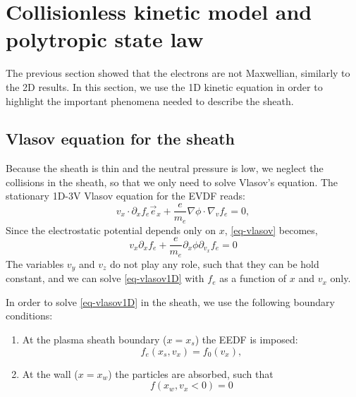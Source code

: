 
\section{Collisionless kinetic model and polytropic state law}
\label{sec-kinetic}


The previous section showed that the electrons are not Maxwellian, similarly to the \ac{2D} results.
In this section, we use the 1D kinetic equation in order to highlight the important phenomena needed to describe the sheath.
\subsection{Vlasov equation for the sheath}

Because the sheath is thin and the neutral pressure is low, we neglect the collisions in the sheath, so that we only need to solve Vlasov's equation.
The stationary 1D-3V Vlasov equation for the EVDF reads\string:
\begin{equation}\label{eq-vlasov}
  v_x \cdot \partial_x f_e \vec{e}_x + \frac{e}{m_e} \nabla \phi \cdot \nabla_v f_e = 0,
\end{equation}
Since the electrostatic potential depends only on $x$, \cref{eq-vlasov} becomes,
\begin{equation}
v_x \partial_x f_e +  \frac{e}{m_e}\partial_x\phi \partial_{v_x} f_e = 0
\label{eq-vlasov1D}
\end{equation}
The variables $v_y$ and $v_z$ do not play any role, such that they can be hold constant, and we can solve \cref{eq-vlasov1D} with $f_e$ as a function of $x$ and $v_x$ only.

In order to solve \cref{eq-vlasov1D} in the sheath,  we use the following boundary conditions\string:
  \begin{enumerate}
\item At the plasma sheath boundary ($x=x_s$) the EEDF is imposed\string:
\begin{equation}
f_e(x_s, v_x) = f_0(v_x),
\label{eq-plasma_BC}
\end{equation}
\item At the wall ($x=x_w$) the particles are absorbed, such that
\begin{equation}
f(x_w, v_x<0) = 0
\label{eq-wall_BC}
\end{equation}
\end{enumerate}

